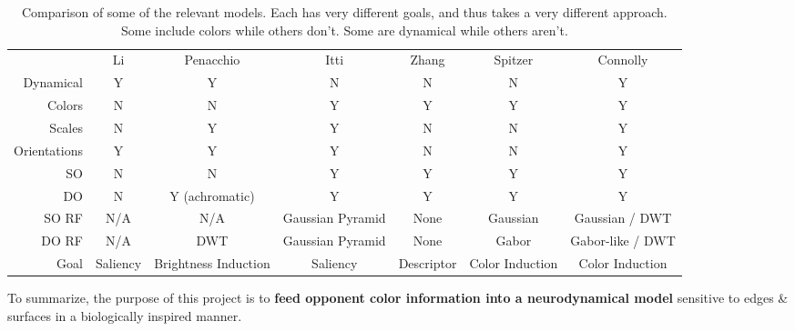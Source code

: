 \documentclass[journal,onecolumn]{IEEEtran}
\begin{document}
\begin{table}[H]
    \centering
    \begin{tabular}{rcccccc}
        \multicolumn{1}{r|}{}                 & Li \cite{li:1999}       & Penacchio \cite{otazu:plosone}                      & Itti            & Zhang           & Spitzer         & Connolly \\ \cline{1-7}
        \multicolumn{1}{r|}{Dynamical}        & Y        & Y                               & N                & N               & N               & Y \\
        \multicolumn{1}{r|}{Colors}           & N        & N                               & Y                & Y               & Y               & Y \\
        \multicolumn{1}{r|}{Scales}           & N        & Y                               & Y                & N               & N               & Y \\
        \multicolumn{1}{r|}{Orientations}     & Y        & Y                               & Y                & N               & N               & Y \\
        \multicolumn{1}{r|}{SO}               & N        & N                               & Y                & Y               & Y               & Y \\
        \multicolumn{1}{r|}{DO}               & N        & Y (achromatic)                  & Y                & Y               & Y               & Y \\
        \multicolumn{1}{r|}{SO RF}            & N/A      & N/A                             & Gaussian Pyramid & None            & Gaussian        & Gaussian / DWT \\
        \multicolumn{1}{r|}{DO RF}            & N/A      & DWT                             & Gaussian Pyramid & None            & Gabor           & Gabor-like / DWT \\
        \multicolumn{1}{r|}{Goal}             & Saliency & Brightness Induction & Saliency & Descriptor       & Color Induction & Color Induction
    \end{tabular}
    \caption{Comparison of some of the relevant models. Each has very different goals, and thus takes a very different approach. Some include colors while others don't. Some are dynamical while others aren't.}
    \label{tab:model-comparison}
\end{table}

To summarize, the purpose of this project is to \textbf{feed opponent color information into a neurodynamical model} sensitive to edges \& surfaces in a biologically inspired manner.
\end{document}
